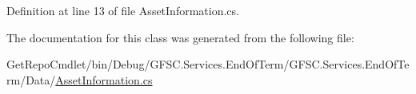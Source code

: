 Definition at line 13 of file Asset\+Information.\+cs.



The documentation for this class was generated from the following file\+:\begin{DoxyCompactItemize}
\item 
Get\+Repo\+Cmdlet/bin/\+Debug/\+G\+F\+S\+C.\+Services.\+End\+Of\+Term/\+G\+F\+S\+C.\+Services.\+End\+Of\+Term/\+Data/\mbox{\hyperlink{_data_2_asset_information_8cs}{Asset\+Information.\+cs}}\end{DoxyCompactItemize}

